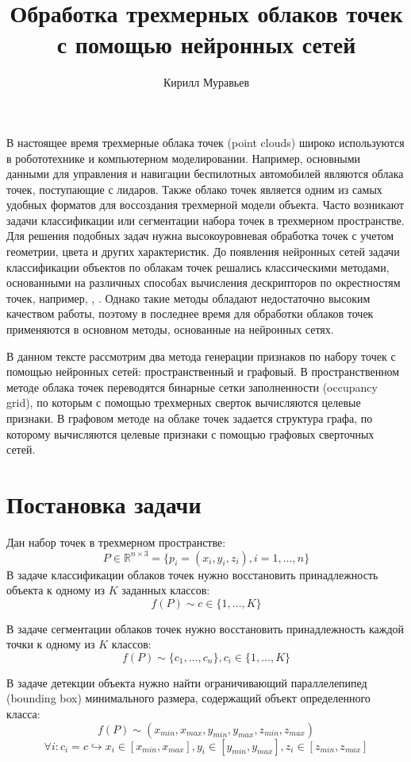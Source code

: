 \documentclass[]{article}
\title{Обработка трехмерных облаков точек с помощью нейронных сетей}
\author{Кирилл Муравьев}
\begin{document}
\maketitle

В настоящее время трехмерные облака точек (point clouds) широко используются в робототехнике и компьютерном моделировании. Например, основными данными для управления и навигации беспилотных автомобилей являются облака точек, поступающие с лидаров. Также облако точек является одним из самых удобных форматов для воссоздания трехмерной модели объекта. Часто возникают задачи классификации или сегментации набора точек в трехмерном пространстве. Для решения подобных задач нужна высокоуровневая обработка точек с учетом геометрии, цвета и других характеристик. До появления нейронных сетей задачи классификации объектов по облакам точек решались классическими методами, основанными на различных способах вычисления дескрипторов по окрестностям точек, например, \cite{lu2014recognizing}, \cite{guo20143d}. Однако такие методы обладают недостаточно высоким качеством работы, поэтому в последнее время для обработки облаков точек применяются в основном методы, основанные на нейронных сетях.

В данном тексте рассмотрим два метода генерации признаков по набору точек с помощью нейронных сетей: пространственный и графовый. В пространственном методе облака точек переводятся бинарные сетки заполненности (occupancy grid), по которым с помощью трехмерных сверток вычисляются целевые признаки. В графовом методе на облаке точек задается структура графа, по которому вычисляются целевые признаки с помощью графовых сверточных сетей.

\section{Постановка задачи}

Дан набор точек в трехмерном пространстве: 
$$P \in \mathbb{R}^{n \times 3} = \{p_i = (x_i, y_i, z_i), i = 1, \dots, n\}$$
В задаче классификации облаков точек нужно восстановить принадлежность объекта к одному из $K$ заданных классов:
$$f(P) \sim c \in \{1, \dots, K\}$$

В задаче сегментации облаков точек нужно восстановить принадлежность каждой точки к одному из $K$ классов:
$$f(P) \sim \{c_1, \dots, c_n\}, c_i \in \{1, \dots, K\}$$

В задаче детекции объекта нужно найти ограничивающий параллелепипед (bounding box) минимального размера, содержащий объект определенного класса:
$$f(P) \sim (x_{min}, x_{max}, y_{min}, y_{max}, z_{min}, z_{max})$$
$$\forall i: c_i = c \hookrightarrow x_i \in [x_{min}, x_{max}], y_i \in [y_{min}, y_{max}], z_i \in [z_{min}, z_{max}]$$
\end{document}
